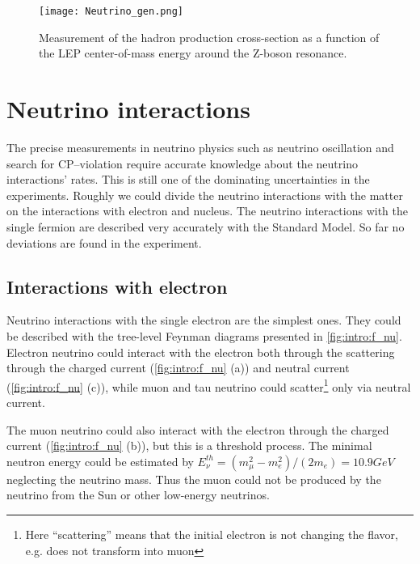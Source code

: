 \documentclass[../main.tex]{subfiles}
\begin{document}
\begin{figure}[!ht]
    \centering
    \texttt{[image: Neutrino\_gen.png]}
    \caption{Measurement of the hadron production cross-section as a function of the LEP center-of-mass energy around the Z-boson resonance.}
    \label{fig:intro:NuGen}
\end{figure}

\section{Neutrino interactions}
The precise measurements in neutrino physics such as neutrino oscillation and search for CP--violation require accurate knowledge about the neutrino interactions' rates. This is still one of the dominating uncertainties in the experiments. Roughly we could divide the neutrino interactions with the matter on the interactions with electron and nucleus. The neutrino interactions with the single fermion are described very accurately with the Standard Model. So far no deviations are found in the experiment.

\subsection{Interactions with electron}
Neutrino interactions with the single electron are the simplest ones. They could be described with the tree-level Feynman diagrams presented in \autoref{fig:intro:f_nu}. Electron neutrino could interact with the electron both through the scattering through the charged current (\autoref{fig:intro:f_nu} (a)) and neutral current (\autoref{fig:intro:f_nu} (c)), while muon and tau neutrino could scatter\footnote{Here ``scattering'' means that the initial electron is not changing the flavor, e.g. does not transform into muon} only via neutral current.

The muon neutrino could also interact with the electron through the charged current (\autoref{fig:intro:f_nu} (b)), but this is a threshold process. The minimal neutron energy could be estimated by $E_\nu^{th}=\left(m_\mu^2-m_e^2\right)/\left(2m_e\right)=10.9GeV$ neglecting the neutrino mass. Thus the muon could not be produced by the neutrino from the Sun or other low-energy neutrinos.
\end{document}
